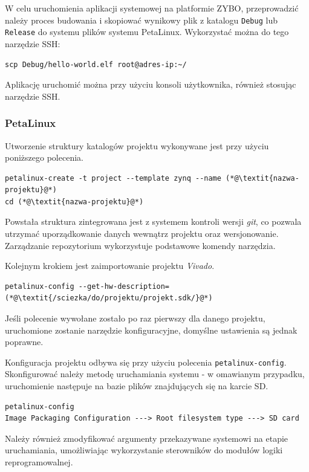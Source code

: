 W celu uruchomienia aplikacji systemowej na platformie ZYBO, przeprowadzić należy proces budowania i skopiować wynikowy plik z katalogu \texttt{Debug} lub \texttt{Release} do systemu plików systemu PetaLinux. Wykorzystać można do tego narzędzie SSH:

\begin{lstlisting}[breaklines=true]
scp Debug/hello-world.elf root@adres-ip:~/
\end{lstlisting}

Aplikację uruchomić można przy użyciu konsoli użytkownika, również stosując narzędzie SSH.
\subsubsection{PetaLinux}
\label{sec:petalinux-config}

Utworzenie struktury katalogów projektu wykonywane jest przy użyciu poniższego polecenia.

\begin{lstlisting}[breaklines=true]
petalinux-create -t project --template zynq --name (*@\textit{nazwa-projektu}@*)
cd (*@\textit{nazwa-projektu}@*)
\end{lstlisting}

Powstała struktura zintegrowana jest z systemem kontroli wersji \emph{git}, co pozwala utrzymać uporządkowanie danych wewnątrz projektu oraz wersjonowanie. Zarządzanie repozytorium wykorzystuje podstawowe komendy narzędzia.

Kolejnym krokiem jest zaimportowanie projektu \emph{Vivado}.

\begin{lstlisting}[breaklines=true]
petalinux-config --get-hw-description=(*@\textit{/sciezka/do/projektu/projekt.sdk/}@*)
\end{lstlisting}

Jeśli polecenie wywołane zostało po raz pierwszy dla danego projektu, uruchomione zostanie narzędzie konfiguracyjne, domyślne ustawienia są jednak poprawne.

Konfiguracja projektu odbywa się przy użyciu polecenia \texttt{petalinux-config}.
Skonfigurować należy metodę uruchamiania systemu - w omawianym przypadku, uruchomienie następuje na bazie plików znajdujących się na karcie SD.
\begin{lstlisting}[breaklines=true]
petalinux-config
Image Packaging Configuration ---> Root filesystem type ---> SD card
\end{lstlisting}

Należy również zmodyfikować argumenty przekazywane systemowi na etapie uruchamiania, umożliwiając wykorzystanie sterowników do modułów logiki reprogramowalnej.

